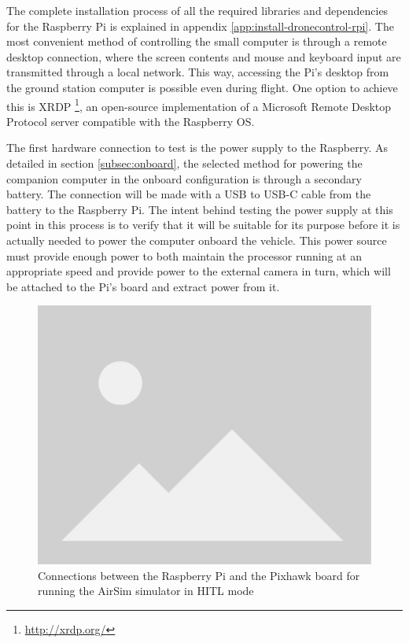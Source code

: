
The complete installation process of all the required libraries and dependencies for the Raspberry Pi is explained in appendix \ref{app:install-dronecontrol-rpi}.
The most convenient method of controlling the small computer is through a remote desktop connection, where the screen contents and mouse and keyboard input are transmitted through a local network.
This way, accessing the Pi's desktop from the ground station computer is possible even during flight.
One option to achieve this is XRDP \footnote{\url{http://xrdp.org/}}, an open-source implementation of a Microsoft Remote Desktop Protocol server compatible with the Raspberry OS.

The first hardware connection to test is the power supply to the Raspberry.
As detailed in section \ref{subsec:onboard}, the selected method for powering the companion computer in the onboard configuration is through a secondary battery.
The connection will be made with a USB to USB-C cable from the battery to the Raspberry Pi.
The intent behind testing the power supply at this point in this process is to verify that it will be suitable for its purpose before it is actually needed to power the computer onboard the vehicle.
This power source must provide enough power to both maintain the processor running at an appropriate speed and provide power to the external camera in turn, which will be attached to the Pi's board and extract power from it.


\begin{figure}
  \centering
  \includegraphics[width=.6\textwidth, keepaspectratio]{img/placeholder.png}
  \caption{Connections between the Raspberry Pi and the Pixhawk board for running the AirSim simulator in HITL mode}
  \label{fig:power-supply}
\end{figure}



